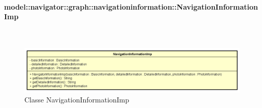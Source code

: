 \documentclass[../DefinizioneDiProdotto.tex]{subfiles}
\begin{document}
\paragraph{model::navigator::graph::navigationinformation::NavigationInformationImp}
\
\begin{figure}[H]
	\centering
	\includegraphics[width=\maxwidth]{img/NavigationInformationImp.png}
	\caption{Classe NavigationInformationImp}\label{fig:model::navigator::graph::navigationinformation::NavigationInformationImp} 
\end{figure}
\end{document}
